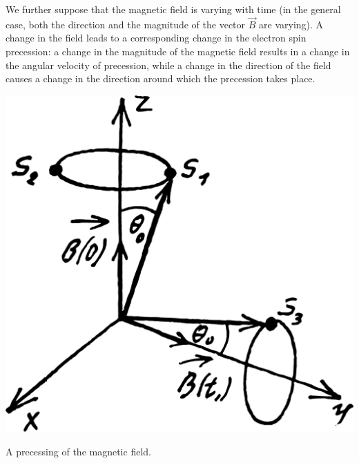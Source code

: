 \documentclass[a4paper,sfsidenotes,colorlinks=true]{tufte-book}
\numberwithin{equation}{section}
\numberwithin{figure}{section}
\begin{document}
We further suppose that the magnetic field is varying with time (in
the general case, both the direction and the magnitude of the vector
$\vec{B}$ are varying). A change in the field leads to a corresponding change
in the electron spin precession: a change in the magnitude of the
magnetic field results in a change in the angular velocity of
precession, while a change in the direction of the field causes a
change in the direction around which the precession takes place.
\begin{marginfigure}%
\centering
\includegraphics[width=\textwidth]{figures/fig-14-02.pdf}
\caption{A precessing of the magnetic field.}
\label{fig-14.2}
\end{marginfigure}
\end{document}

